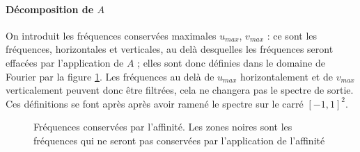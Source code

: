 	\paragraph{Décomposition de $A$}
		
		On introduit les fréquences conservées maximales $u_{max}$, $v_{max}$ : ce sont les fréquences, horizontales et verticales, au delà desquelles les fréquences seront effacées par l'application de $A$ ; elles sont donc définies dans le domaine de Fourier par la figure \ref{uMax_vMax}. Les fréquences au delà de $u_{max}$ horizontalement et de $v_{max}$ verticalement peuvent donc être filtrées, cela ne changera pas le spectre de sortie. Ces définitions se font après après avoir ramené le spectre sur le carré $[-1,1]^2$.
		
		\begin{figure}
		\centering
		\caption{Fréquences conservées par l'affinité. Les zones noires sont les fréquences qui ne seront pas conservées par l'application de l'affinité}
		\label{uMax_vMax}
		\end{figure}
		
